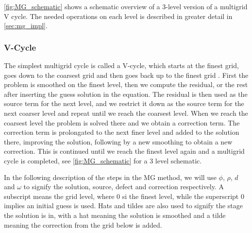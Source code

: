 	\cref{fig:MG_schematic} shows a schematic overview of a \(3\)-level
	version of a multigrid V cycle. The needed operations on each
	level is described in greater detail in \cref{sec:mg_impl}.

	\subsubsection{V-Cycle}
		\label{sec:V_cycle}
		The simplest multigrid cycle is called a V-cycle, which starts at the finest grid, goes down to the coarsest grid and then goes back up
		to the finest grid \citep{press_numerical_1988}. First the problem is smoothed on the finest level, then we compute the residual, or the rest after inserting the guess solution
		in the equation. The residual is then used as the source term for the next level, and we restrict it down as the source term for the next
		coarser level and repeat until we reach the coarsest level. When we reach the coarsest level the problem is solved there and we obtain a correction
		term. The correction term is prolongated to the next finer level and added to the solution there, improving the solution, following by a new smoothing
		to obtain a new correction. This is continued until we reach the finest level again and a multigrid cycle is completed, see \cref{fig:MG_schematic} for a 3
		level schematic.

		In the following description of the steps in the MG method, we will use \(\phi\), \(\rho\), \(d\) and \(\omega\) to signify the solution, source,
		defect and correction respectively. A subscript means the grid level, where \(0\) si the finest level, while the superscript \(0\) implies an initial guess is used. Hats and tildes are also
	 	used to signify the stage the solution is in, with a hat meaning the solution is smoothed and a tilde meaning the correction from the grid below is added.

